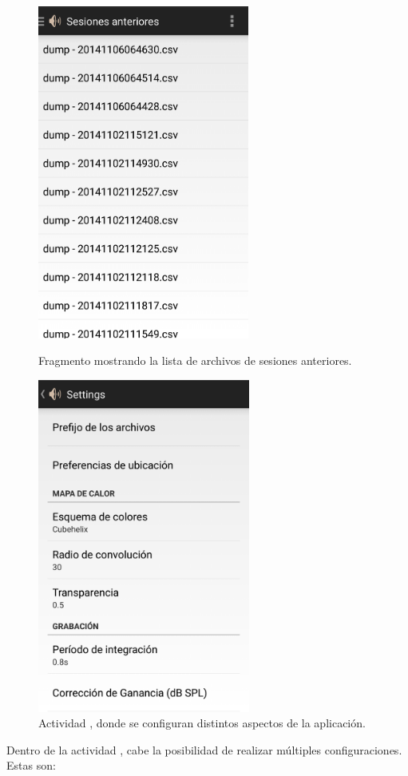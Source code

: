 \begin{figure}[H] \centering%
 \begin{minipage}{0.45\textwidth}\centering%
    \includegraphics[height=11cm]{graphs/sessions.png} \caption{Fragmento  mostrando la lista de archivos de sesiones anteriores.}\label{fig:screen:sessions}%
 \end{minipage}
 \hfill
\begin{minipage}{0.45\textwidth}\centering%
 \includegraphics[height=11cm]{graphs/settings.png} \caption{Actividad , donde se configuran distintos aspectos de la aplicación.}\label{fig:screen:settings}
\end{minipage}
\end{figure}
    Dentro de la actividad , cabe la posibilidad de realizar múltiples configuraciones. Estas son:
    
